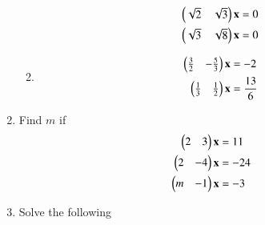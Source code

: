 \begin{enumerate}[label=\arabic*.,ref=\thesubsection.\theenumi]
\begin{enumerate}[itemsep=2pt]
\begin{align}
\begin{split}
\begin{pmatrix}\sqrt{2} & \sqrt{3} \end{pmatrix}\mathbf{x}&=0
\\
\begin{pmatrix}\sqrt{3} & \sqrt{8} \end{pmatrix}\mathbf{x}&=0
\end{split}
\end{align}
\item
\begin{align}
\begin{split}
\begin{pmatrix}\frac{3}{2} & -\frac{5}{3} \end{pmatrix}\mathbf{x}&=-2
\\
\begin{pmatrix}\frac{1}{3} & \frac{1}{2} \end{pmatrix}\mathbf{x}&=\frac{13}{6}
\end{split}
\end{align}
\end{enumerate}
%
\item Find $m$ if 
\begin{align}
\begin{split}
\begin{pmatrix}2 & 3 \end{pmatrix}\mathbf{x}&=11
\\
\begin{pmatrix}2 & -4 \end{pmatrix}\mathbf{x}&=-24
\\
\begin{pmatrix}m & -1 \end{pmatrix}\mathbf{x}&=-3
\\
\end{split}
\end{align}
%
%
\item Solve the following
%
\begin{enumerate}[itemsep=2pt]
\end{enumerate}
\end{enumerate}
